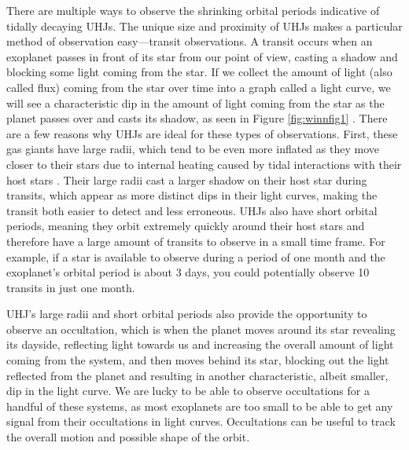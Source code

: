 \documentclass[oneside,12pt]{amsart}
\numberwithin{page}{section}
\begin{document}
There are multiple ways to observe the shrinking orbital periods indicative of tidally decaying UHJs. The unique size and proximity of UHJs makes a particular method of observation easy—transit observations. A transit occurs when an exoplanet passes in front of its star from our point of view, casting a shadow and blocking some light coming from the star. If we collect the amount of light (also called flux) coming from the star over time into a graph called a light curve, we will see a characteristic dip in the amount of light coming from the star as the planet passes over and casts its shadow, as seen in Figure \ref{fig:winnfig1} \citep{winn2010transits}. There are a few reasons why UHJs are ideal for these types of observations. First, these gas giants have large radii, which tend to be even more inflated as they move closer to their stars due to internal heating caused by tidal interactions with their host stars \citep{ogilvie2014tidal}. Their large radii cast a larger shadow on their host star during transits, which appear as more distinct dips in their light curves, making the transit both easier to detect and less erroneous. UHJs also have short orbital periods, meaning they orbit extremely quickly around their host stars and therefore have a large amount of transits to observe in a small time frame. For example, if a star is available to observe during a period of one month and the exoplanet's orbital period is about 3 days, you could potentially observe 10 transits in just one month. 

UHJ's large radii and short orbital periods also provide the opportunity to observe an occultation, which is when the planet moves around its star revealing its dayside, reflecting light towards us and increasing the overall amount of light coming from the system, and then moves behind its star, blocking out the light reflected from the planet and resulting in another characteristic, albeit smaller, dip in the light curve. We are lucky to be able to observe occultations for a handful of these systems, as most exoplanets are too small to be able to get any signal from their occultations in light curves. Occultations can be useful to track the overall motion and possible shape of the orbit. 
\end{document}
